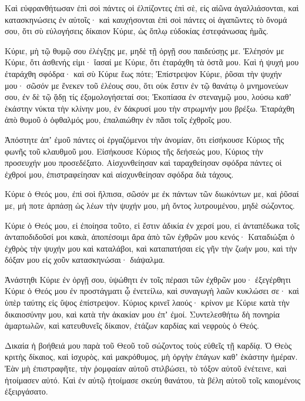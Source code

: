\begin{spacing}{1.1}
\begin{multicols}{2}
Καὶ εὐφρανθήτωσαν ἐπὶ σοὶ πάντες οἱ ἐλπίζοντες ἐπὶ σὲ, εἰς αἰῶνα ἀγαλλιάσονται, καὶ κατασκηνώσεις ἐν αὐτοῖς· καὶ καυχήσονται ἐπὶ σοὶ πάντες οἱ ἀγαπῶντες τὸ ὄνομά σου,
ὅτι σὺ εὐλογήσεις δίκαιον Κύριε, ὡς ὅπλῳ εὐδοκίας ἐστεφάνωσας ἡμᾶς.

Κύριε, μὴ τῷ θυμῷ σου ἐλέγξῃς με, μηδὲ τῇ ὀργῇ σου παιδεύσῃς με.
Ἐλέησόν με Κύριε, ὅτι ἀσθενής εἰμι· ἴασαί με Κύριε, ὅτι ἐταράχθη τὰ ὀστᾶ μου.
Καὶ ἡ ψυχή μου ἐταράχθη σφόδρα· καὶ σὺ Κύριε ἕως πότε;
Ἐπίστρεψον Κύριε, ῥῦσαι τὴν ψυχήν μου· σῶσόν με ἕνεκεν τοῦ ἐλέους σου,
ὅτι οὐκ ἔστιν ἐν τῷ θανάτῳ ὁ μνημονεύων σου, ἐν δὲ τῷ ᾅδῃ τίς ἐξομολογήσεταί σοι;
Ἐκοπίασα ἐν στεναγμῷ μου, λούσω καθʼ ἑκάστην νύκτα τὴν κλίνην μου, ἐν δάκρυσί μου τὴν στρωμνήν μου βρέξω.
Ἐταράχθη ἀπὸ θυμοῦ ὁ ὀφθαλμός μου, ἐπαλαιώθην ἐν πᾶσι τοῖς ἐχθροῖς μου.

Ἀπόστητε ἀπʼ ἐμοῦ πάντες οἱ ἐργαζόμενοι τὴν ἀνομίαν, ὅτι εἰσήκουσε Κύριος τῆς φωνῆς τοῦ κλαυθμοῦ μου.
Εἰσήκουσε Κύριος τῆς δεήσεώς μου, Κύριος τὴν προσευχήν μου προσεδέξατο.
Αἰσχυνθείησαν καὶ ταραχθείησαν σφόδρα πάντες οἱ ἐχθροί μου, ἐπιστραφείησαν καὶ αἰσχυνθείησαν σφόδρα διὰ τάχους.

Κύριε ὁ Θεός μου, ἐπὶ σοὶ ἤλπισα, σῶσόν με ἐκ πάντων τῶν διωκόντων με, καὶ ῥῦσαί με,
μή ποτε ἁρπάσῃ ὡς λέων τὴν ψυχήν μου, μὴ ὄντος λυτρουμένου, μηδὲ σώζοντος.

Κύριε ὁ Θεός μου, εἰ ἐποίησα τοῦτο, εἰ ἔστιν ἀδικία ἐν χερσί μου,
εἰ ἀνταπέδωκα τοῖς ἀνταποδιδοῦσί μοι κακὰ, ἀποπέσοιμι ἄρα ἀπὸ τῶν ἐχθρῶν μου κενός·
Καταδιώξαι ὁ ἐχθρὸς τὴν ψυχήν μου καὶ καταλάβοι, καὶ καταπατήσαι εἰς γῆν τὴν ζωήν μου, καὶ τὴν δόξαν μου εἰς χοῦν κατασκηνώσαι· διάψαλμα.

Ἀνάστηθι Κύριε ἐν ὀργῇ σου, ὑψώθητι ἐν τοῖς πέρασι τῶν ἐχθρῶν μου· ἐξεγέρθητι Κύριε ὁ Θεός μου ἐν προστάγματι ᾧ ἐνετείλω,
καὶ συναγωγὴ λαῶν κυκλώσει σε· καὶ ὑπὲρ ταύτης εἰς ὕψος ἐπίστρεψον.
Κύριος κρινεῖ λαούς· κρίνον με Κύριε κατὰ τὴν δικαιοσύνην μου, καὶ κατὰ τὴν ἀκακίαν μου ἐπʼ ἐμοί.
Συντελεσθήτω δὴ πονηρία ἁμαρτωλῶν, καὶ κατευθυνεῖς δίκαιον, ἐτάζων καρδίας καὶ νεφροὺς ὁ Θεός.

Δικαία ἡ βοήθειά μου παρὰ τοῦ Θεοῦ τοῦ σώζοντος τοὺς εὐθεῖς τῇ καρδίᾳ.
Ὁ Θεὸς κριτὴς δίκαιος, καὶ ἰσχυρὸς, καὶ μακρόθυμος, μὴ ὀργὴν ἐπάγων καθʼ ἑκάστην ἡμέραν.
Ἐὰν μὴ ἐπιστραφῆτε, τὴν ῥομφαίαν αὐτοῦ στιλβώσει, τὸ τόξον αὐτοῦ ἐνέτεινε, καὶ ἡτοίμασεν αὐτό.
Καὶ ἐν αὐτῷ ἡτοίμασε σκεύη θανάτου, τὰ βέλη αὐτοῦ τοῖς καιομένοις ἐξειργάσατο.


\end{multicols}
\end{spacing}
